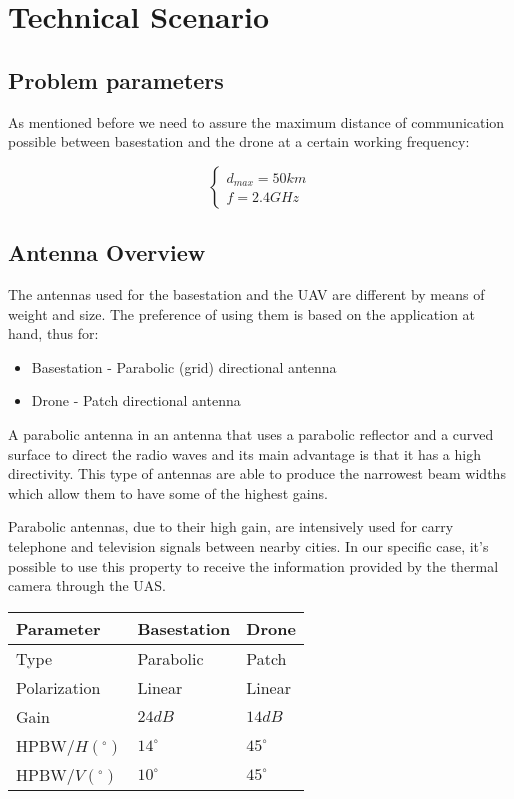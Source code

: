 \chapter*{Technical Scenario}\label{ch:technical_scenario}

\section*{Problem parameters}
As mentioned before we need to assure the maximum distance of communication possible between basestation and the drone at a certain working frequency:

\begin{equation*}\label{eq:tech_parameters1} 
 	\begin{cases}
 		d_{max} = 50 km	\\
 		f = 2.4 GHz
 	\end{cases}
\end{equation*}

\section*{Antenna Overview}
The antennas used for the basestation and the UAV are different by means of weight and size. The preference of using them is based on the application at hand, thus for:
\begin{itemize}
	\item Basestation - Parabolic (grid) directional antenna 
	\item Drone - Patch directional antenna
\end{itemize}

A parabolic antenna in an antenna that uses a parabolic reflector and a curved surface to direct the radio waves and its main advantage is that it has a high directivity. This type of antennas are able to produce the narrowest beam widths which allow them to have some of the highest gains.

Parabolic antennas, due to their high gain, are intensively used for carry telephone and television signals between nearby cities. In our specific case, it’s possible to use this property to receive the information provided by the thermal camera through the UAS.

\begin{table}[h!]
\centering
	\begin{tabular}{|p{3cm}||p{3cm}|p{3cm}|}
		\hline
		Parameter & Basestation & Drone\\ \hline
		Type & Parabolic & Patch\\ \hline
		Polarization & Linear & Linear\\ \hline
		Gain & $24dB$ & $14dB$\\ \hline
		HPBW/$H(^{\circ})$ & $14^{\circ}$ & $45^{\circ}$\\ \hline
		HPBW/$V(^{\circ})$ & $10^{\circ}$ & $45^{\circ}$\\ \hline
	\end{tabular}
\end{table}